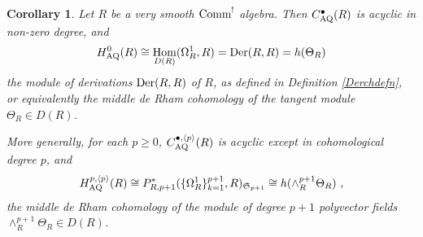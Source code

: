 \documentclass[11pt]{amsart}
\numberwithin{equation}{section}
\newtheorem{coro}[theo]{Corollary}
\theoremstyle{definition}
\newtheorem{defn}[theo]{Definition}
\newcommand{\mc}{\mathcal}
\newcommand{\mf}{\mathfrak}
\newcommand{\AQ}{{\textup{AQ}}}
\DeclareMathOperator{\Hom}{Hom}
\newcommand{\Der}{{\textup{Der}}}
\newcommand{\Comm}{{\textup{Comm}}}
\newcommand{\Lie}{{\textup{Lie}}}
\newcommand{\Ss}{{{\mf{S}}}}
\newcommand{\0}{{\textbf{0}}}
\newcommand{\DD}{{D}}
\def \mf{\mathfrak}
\begin{document}
\begin{coro}\label{smthchcoro} Let $R$ be a very smooth $\Comm^!$ algebra. Then $C^\bullet_\AQ(R)$ is acyclic in non-zero degree, and
	\[ H^0_\AQ(R)\cong \Hom_{\DD(R)}(\Omega^1_R,R) = \Der(R,R) = h(\Theta_R) \]
	the module of derivations $ \Der(R,R) $ of $R$, as defined in Definition \ref{Derchdefn}, or equivalently the middle de Rham cohomology of the tangent module $\Theta_R  \in \DD(R)$.
	
	More generally, for each $p\geq 0$, $C^{\bullet,\langle p \rangle }_\AQ(R)$ is acyclic except in cohomological degree $p$, and
	\[ H^{p,\langle p \rangle}_\AQ(R)\cong P^*_{R,p+1}(\{\Omega^1_R\}_{k=1}^{p+1},R)_{\Ss_{p+1}} \cong h(\wedge^{p+1}_R\Theta_R) \ , \]
	the middle de Rham cohomology of the module of degree ${p+1}$ polyvector fields $\wedge^{p+1}_R \Theta_R \in \DD(R)$.
\end{coro}










\iffalse
\end{document}
